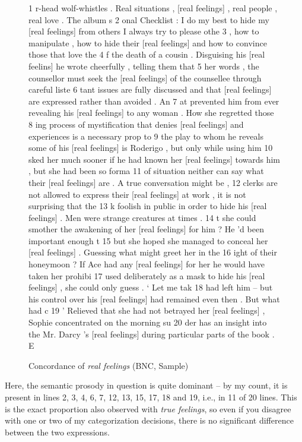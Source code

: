 \begin{figure}
\caption{Concordance of \textit{real feelings} (BNC, Sample)}
\label{fig:realfeelings}
\hrulefill
\begin{fitverb}
 1 r-head wolf-whistles . Real situations , [real feelings] , real people , real love . The album s
 2 onal Checklist : I do my best to hide my [real feelings] from others I always try to please othe
 3  , how to manipulate , how to hide their [real feelings] and how to convince those that love the
 4 f the death of a cousin . Disguising his [real feelins] he wrote cheerfully , telling them that
 5 her words , the counsellor must seek the [real feelings] of the counsellee through careful liste
 6 tant issues are fully discussed and that [real feelings] are expressed rather than avoided . An
 7 at prevented him from ever revealing his [real feelings] to any woman . How she regretted those
 8 ing process of mystification that denies [real feelings] and experiences is a necessary prop to
 9  the play to whom he reveals some of his [real feelings] is Roderigo , but only while using him
10 sked her much sooner if he had known her [real feelings] towards him , but she had been so forma
11  of situation neither can say what their [real feelings] are . A true conversation might be ,
12  clerks are not allowed to express their [real feelings] at work , it is not surprising that the
13 k foolish in public in order to hide his [real feelings] . Men were strange creatures at times .
14 t she could smother the awakening of her [real feelings] for him ? He 'd been important enough t
15 but she hoped she managed to conceal her [real feelings] . Guessing what might greet her in the
16 ight of their honeymoon ? If Ace had any [real feelings] for her he would have taken her prohibi
17  used deliberately as a mask to hide his [real feelings] , she could only guess . ` Let me tak
18 had left him -- but his control over his [real feelings] had remained even then . But what had c
19 ' Relieved that she had not betrayed her [real feelings] , Sophie concentrated on the morning su
20 der has an insight into the Mr. Darcy 's [real feelings] during particular parts of the book . E
\end{fitverb}
\hrulefill
\end{figure}

Here, the semantic  prosody in question is quite dominant -- by my count, it is present in lines 2, 3, 4, 6, 7, 12, 13, 15, 17, 18 and 19, i.e., in 11 of 20 lines. This is the exact proportion also observed with \textit{true feelings},  so even if you disagree with one or two of my categorization  decisions, there is no significant difference between the two expressions.

